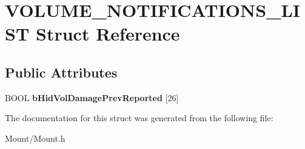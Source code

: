 \hypertarget{struct_v_o_l_u_m_e___n_o_t_i_f_i_c_a_t_i_o_n_s___l_i_s_t}{}\section{V\+O\+L\+U\+M\+E\+\_\+\+N\+O\+T\+I\+F\+I\+C\+A\+T\+I\+O\+N\+S\+\_\+\+L\+I\+ST Struct Reference}
\label{struct_v_o_l_u_m_e___n_o_t_i_f_i_c_a_t_i_o_n_s___l_i_s_t}
\subsection*{Public Attributes}
\begin{DoxyCompactItemize}
\item 
\mbox{\label{struct_v_o_l_u_m_e___n_o_t_i_f_i_c_a_t_i_o_n_s___l_i_s_t_a5660554592983ef9a3d54ff6f8a47189}} 
B\+O\+OL {\bfseries b\+Hid\+Vol\+Damage\+Prev\+Reported} \mbox{[}26\mbox{]}
\end{DoxyCompactItemize}


The documentation for this struct was generated from the following file\+:\begin{DoxyCompactItemize}
\item 
Mount/Mount.\+h\end{DoxyCompactItemize}
